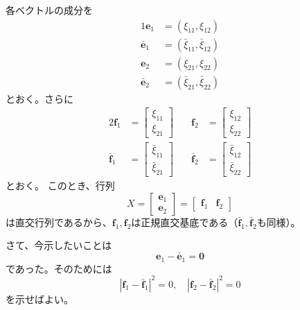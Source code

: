 \documentclass[a4j,disablejfam,dvipdfmx,papersize,slide,uplatex,21pt]{jsarticle}
\makeatletter
\renewenvironment{proof}[1][\proofname]{\par
        \pushQED{\qed}
        \normalfont
        \topsep6\p@\@plus6\p@ \trivlist
        \item[\hskip\labelsep{\bfseries #1}\@addpunct{\bfseries}]\ignorespaces
    }{%
        \popQED\endtrivlist\@endpefalse
    }
\renewcommand{\proofname}{証明.}
\makeatother
\begin{document}
\begin{proof}
    \newpage
    各ベクトルの成分を
    \begin{alignat}{1}
              \bm{e}_1 &= (\xi_{11}, \xi_{12}) \\
        \bar{\bm{e}}_1 &= (\bar{\xi}_{11}, \bar{\xi}_{12}) \\
              \bm{e}_2 &= (\xi_{21}, \xi_{22}) \\
        \bar{\bm{e}}_2 &= (\bar{\xi}_{21}, \bar{\xi}_{22})
    \end{alignat}
    とおく。さらに
    \begin{alignat}{2}
        \bm{f}_1 &= \left[
            \begin{array}{c}
                \xi_{11} \\
                \xi_{21}
            \end{array}
        \right] \quad
        &
        \bm{f}_2 &= \left[
            \begin{array}{c}
                \xi_{12} \\
                \xi_{22}
            \end{array}
        \right] \\
        \bar{\bm{f}}_1 &= \left[
            \begin{array}{c}
                \bar{\xi}_{11} \\
                \bar{\xi}_{21}
            \end{array}
        \right] \quad
        &
        \bar{\bm{f}}_2 &= \left[
            \begin{array}{c}
                \bar{\xi}_{12} \\
                \bar{\xi}_{22}
            \end{array}
        \right]
    \end{alignat}
    とおく。
    このとき、行列
    \begin{equation}
        X = \left[
            \begin{array}{c}
                \bm{e}_1 \\
                \bm{e}_2
            \end{array}
        \right]
        = [
            \begin{array}{cc}
                \bm{f}_1 & \bm{f}_2
            \end{array}]
    \end{equation}
    は直交行列であるから、$\bm{f}_1, \bm{f}_2$は正規直交基底である（$\bar{\bm{f}}_1, \bar{\bm{f}}_2$も同様）。

    \newpage
    さて、今示したいことは
    \begin{equation}
        \bm{e}_1 - \bar{\bm{e}}_1 = \bm{0}
    \end{equation}
    であった。そのためには
    \begin{equation}
        |\bm{f}_1 - \bar{\bm{f}}_1|^2 = 0, \quad
        |\bm{f}_2 - \bar{\bm{f}}_2|^2 = 0
    \end{equation}
    を示せばよい。


\end{proof}
\end{document}
